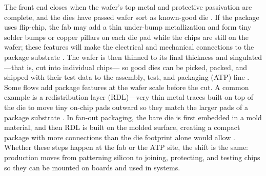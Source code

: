 The front end closes when the wafer's top metal and protective passivation are complete, and the dies have passed wafer sort as known-good die \parencite{irds_factory_integration_technical_working_group_international_2023}. If the package uses flip-chip, the fab may add a thin under-bump metallization and form tiny solder bumps or copper pillars on each die pad while the chips are still on the wafer; these features will make the electrical and mechanical connections to the package substrate \parencite{nishi_handbook_2007}. The wafer is then thinned to its final thickness and singulated---that is, cut into individual chips--- so good dies can be picked, packed, and shipped with their test data to the assembly, test, and packaging (ATP) line \parencite{nishi_handbook_2007, varas_strengthening_2021}. Some flows add package features at the wafer scale before the cut. A common example is a redistribution layer (RDL)---very thin metal traces built on top of the die to move tiny on-chip pads outward so they match the larger pads of a package substrate \parencite{ieee_electronics_packaging_society_heterogeneous_2024,garrou_handbook_2008}. In fan-out packaging, the bare die is first embedded in a mold material, and then RDL is built on the molded surface, creating a compact package with more connections than the die footprint alone would allow \parencite{garrou_handbook_2008}. Whether these steps happen at the fab or the ATP site, the shift is the same: production moves from patterning silicon to joining, protecting, and testing chips so they can be mounted on boards and used in systems.

